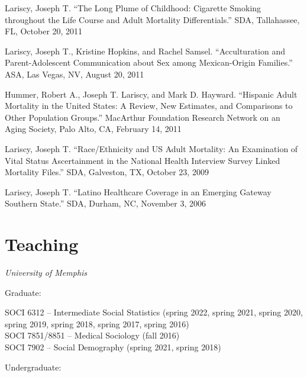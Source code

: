\documentclass[11pt,]{article}
\begin{document}
Lariscy, Joseph T. ``The Long Plume of Childhood: Cigarette Smoking
throughout the Life Course and Adult Mortality Differentials.'' SDA,
Tallahassee, FL, October 20, 2011

Lariscy, Joseph T., Kristine Hopkins, and Rachel Samsel. ``Acculturation
and Parent-Adolescent Communication about Sex among Mexican-Origin
Families.'' ASA, Las Vegas, NV, August 20, 2011

Hummer, Robert A., Joseph T. Lariscy, and Mark D. Hayward. ``Hispanic
Adult Mortality in the United States: A Review, New Estimates, and
Comparisons to Other Population Groups.'' MacArthur Foundation Research
Network on an Aging Society, Palo Alto, CA, February 14, 2011

Lariscy, Joseph T. ``Race/Ethnicity and US Adult Mortality: An
Examination of Vital Status Ascertainment in the National Health
Interview Survey Linked Mortality Files.'' SDA, Galveston, TX, October
23, 2009

Lariscy, Joseph T. ``Latino Healthcare Coverage in an Emerging Gateway
Southern State.'' SDA, Durham, NC, November 3, 2006

\hypertarget{teaching}{%
\section{Teaching}\label{teaching}}

\emph{University of Memphis}

\setlength{\leftskip}{0.5cm}

Graduate:

\setlength{\leftskip}{0pt}
\setlength{\leftskip}{1cm}

SOCI 6312 -- Intermediate Social Statistics (spring 2022, spring 2021,
spring 2020,\\
\hspace*{0.333em}\hspace*{0.333em}\hspace*{0.333em}\hspace*{0.333em}spring
2019, spring 2018, spring 2017, spring 2016)\\
SOCI 7851/8851 -- Medical Sociology (fall 2016)\\
SOCI 7902 -- Social Demography (spring 2021, spring 2018)

\setlength{\leftskip}{0pt}

\setlength{\leftskip}{0.5cm}

Undergraduate:

\setlength{\leftskip}{0pt}
\setlength{\leftskip}{1cm}
\end{document}
